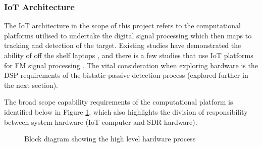 \documentclass[12pt,a4paper]{article}
\begin{document}
\subsubsection{IoT Architecture}
The IoT architecture in the scope of this project refers to the computational platforms utilised to undertake the digital signal processing which then maps to tracking and detection of the target. Existing studies have demonstrated the ability of off the shelf laptops \cite{FMlowCost}, and there is a few studies that use IoT platforms for FM signal processing \cite{IOTpassiveRadar}. The vital consideration when exploring hardware is the DSP requirements of the bistatic passive detection process (explored further in the next section).
\par \vspace{0.5cm} 
\noindent The broad scope capability requirements of the computational platform is identified below in Figure \ref{fig:signal_processing_flow}, which also highlights the division of responsibility between system hardware (IoT computer and SDR hardware).

\begin{figure}[htbp]
    \centering
    \caption{Block diagram showing the high level hardware process}
    \label{fig:signal_processing_flow}
    \end{figure}
    
\end{document}
